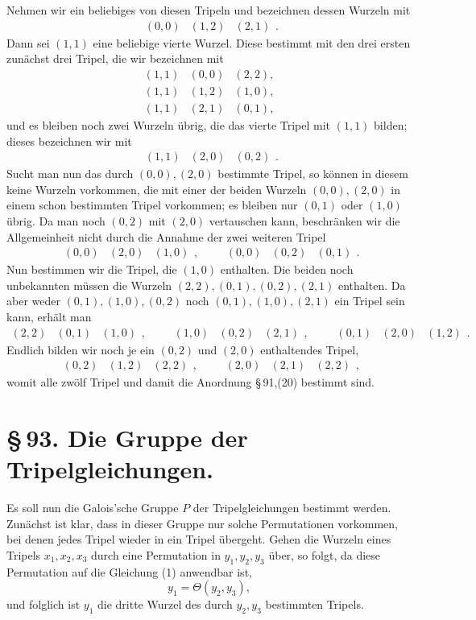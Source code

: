 \documentclass[11pt]{article}
\providecommand{\trip}[3]{\begin{array}{ccc}#1&#2&#3\end{array}}
\begin{document}
Nehmen wir ein beliebiges von diesen Tripeln und bezeichnen dessen Wurzeln mit
\[
\trip{(0,0)}{(1,2)}{(2,1)}.
\]
Dann sei \((1,1)\) eine beliebige vierte Wurzel. Diese bestimmt mit den drei ersten zunächst drei Tripel, die wir bezeichnen mit
\[
\begin{array}{ccc}
(1,1)&(0,0)&(2,2),\\
(1,1)&(1,2)&(1,0),\\
(1,1)&(2,1)&(0,1),
\end{array}
\]
und es bleiben noch zwei Wurzeln übrig, die das vierte Tripel mit \((1,1)\) bilden; dieses bezeichnen wir mit
\[
\trip{(1,1)}{(2,0)}{(0,2)}.
\]
Sucht man nun das durch \((0,0),(2,0)\) bestimmte Tripel, so können in diesem keine Wurzeln vorkommen, die mit einer der beiden Wurzeln \((0,0),(2,0)\) in einem schon bestimmten Tripel vorkommen; es bleiben nur \((0,1)\) oder \((1,0)\) übrig. Da man noch \((0,2)\) mit \((2,0)\) vertauschen kann, beschränken wir die Allgemeinheit nicht durch die Annahme der zwei weiteren Tripel
\[
\trip{(0,0)}{(2,0)}{(1,0)},
\qquad
\trip{(0,0)}{(0,2)}{(0,1)}.
\]
Nun bestimmen wir die Tripel, die \((1,0)\) enthalten. Die beiden noch unbekannten müssen die Wurzeln \((2,2),(0,1),(0,2),(2,1)\) enthalten. Da aber weder \((0,1),(1,0),(0,2)\) noch \((0,1),(1,0),(2,1)\) ein Tripel sein kann, erhält man
\[
\trip{(2,2)}{(0,1)}{(1,0)},
\qquad
\trip{(1,0)}{(0,2)}{(2,1)},
\qquad
\trip{(0,1)}{(2,0)}{(1,2)}.
\]
Endlich bilden wir noch je ein \((0,2)\) und \((2,0)\) enthaltendes Tripel,
\[
\trip{(0,2)}{(1,2)}{(2,2)},
\qquad
\trip{(2,0)}{(2,1)}{(2,2)},
\]
womit alle zwölf Tripel und damit die Anordnung \S\,91,(20) bestimmt sind.

\section*{\S\,93. Die Gruppe der Tripelgleichungen.}

Es soll nun die Galois'sche Gruppe \(P\) der Tripelgleichungen bestimmt werden. Zunächst ist klar, dass in dieser Gruppe nur solche Permutationen vorkommen, bei denen jedes Tripel wieder in ein Tripel übergeht. Gehen die Wurzeln eines Tripels \(x_1,x_2,x_3\) durch eine Permutation in \(y_1,y_2,y_3\) über, so folgt, da diese Permutation auf die Gleichung (1) anwendbar ist,
\[
 y_1=\Theta(y_2,y_3),
\]
und folglich ist \(y_1\) die dritte Wurzel des durch \(y_2,y_3\) bestimmten Tripels.
\end{document}
